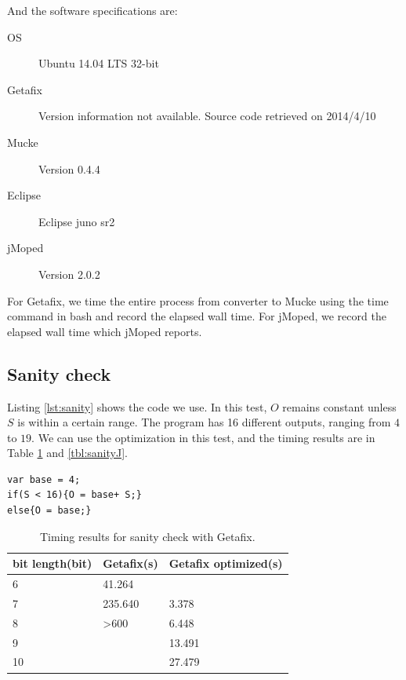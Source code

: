 And the software specifications are:
\begin{description}
  \item[OS] Ubuntu 14.04 LTS 32-bit
  \item[Getafix] Version information not available. Source code retrieved on 2014/4/10
  \item[Mucke] Version 0.4.4
  \item[Eclipse] Eclipse juno sr2
  \item[jMoped] Version 2.0.2
\end{description}

For Getafix, we time the entire process from converter to Mucke using the time command in bash and record the elapsed wall time. For jMoped, we record the elapsed wall time which jMoped reports.

\subsection{Sanity check}
Listing \ref{lst:sanity} shows the code we use. In this test, $O$ remains constant unless $S$ is within a certain range. The program has 16 different outputs, ranging from $4$ to $19$. We can use the optimization in this test, and the timing results are in Table \ref{tbl:sanityG} and \ref{tbl:sanityJ}.

\lstset{language=C}  
\begin{lstlisting}[float=!h, caption={Sanity check test program.},label=lst:sanity]
var base = 4;
if(S < 16){O = base+ S;}
else{O = base;}
\end{lstlisting}

\begin{table}[!h]
\centering
\begin{tabular}{|l|l|l|}
\hline
bit length(bit) & Getafix(s) & Getafix optimized(s)  \\ \hline
6 & 41.264 & {}  \\ \hline
7 & 235.640 & 3.378  \\ \hline
8 & \textgreater 600 & 6.448 \\ \hline
9 &  & 13.491\\ \hline
10 &  & 27.479 \\ \hline
\end{tabular}
\caption{Timing results for sanity check with Getafix.}
\label{tbl:sanityG}
\end{table}

